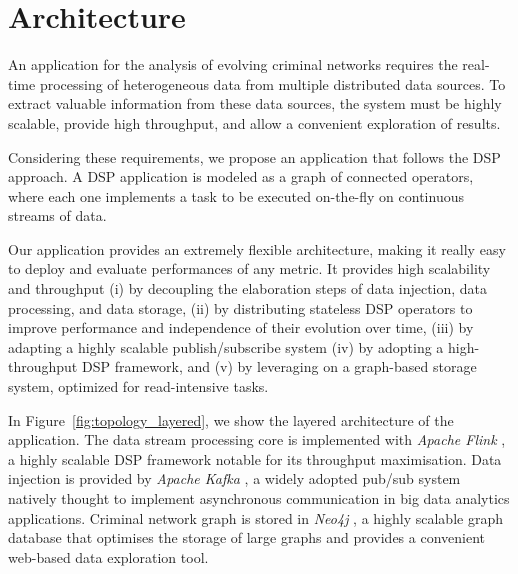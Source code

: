 \section{Architecture}
\label{sec:architecture}

An application for the analysis of evolving criminal networks requires the real-time processing of heterogeneous data from multiple distributed data sources.
%
To extract valuable information from these data sources, the system must be highly scalable, provide high throughput, and allow a convenient exploration of results.

Considering these requirements, we propose an application that follows the 
DSP approach. 
A DSP application is modeled as a graph of connected operators, where each one implements a task to be executed on-the-fly on continuous streams of data.

Our application provides an extremely flexible architecture, making it really easy to deploy and evaluate performances of any metric.
It provides high scalability and throughput 
(i) by decoupling the elaboration steps of data injection, data processing, and data storage, 
(ii) by distributing stateless DSP operators to improve performance and independence of their evolution over time,
(iii) by adapting a highly scalable publish/subscribe system 
(iv) by adopting a high-throughput DSP framework,
and (v) by leveraging on a graph-based storage system, optimized for read-intensive tasks.

In Figure~\ref{fig:topology_layered}, we show the layered architecture of the application. The data stream processing core is implemented with \textit{Apache Flink} \cite{flink}, a highly scalable DSP framework notable for its throughput maximisation.
Data injection is provided by \textit{Apache Kafka} \cite{kafka}, a widely adopted pub/sub system natively thought to implement asynchronous communication in big data analytics applications.
Criminal network graph is stored in \textit{Neo4j} \cite{neo4j}, a highly scalable graph database that optimises the storage of large graphs and provides a convenient web-based data exploration tool.

